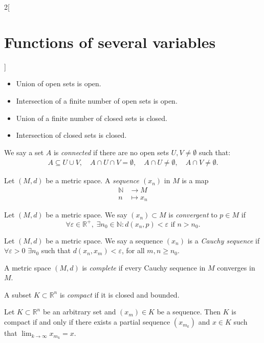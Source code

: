 \documentclass[../../../main.tex]{subfiles}
\begin{document}
\begin{multicols}{2}[\section{Functions of several variables}]
\begin{prop}
\hfill
\begin{itemize}
    \item Union of open sets is open.
    \item Intersection of a finite number of open sets is open.
    \item Union of a finite number of closed sets is closed.
    \item Intersection of closed sets is closed.
\end{itemize}
\end{prop}
\begin{definition}
We say a set $A$ is \textit{connected} if there are no open sets $U,V\ne\emptyset$ such that: 
\begin{gather*}
    A\subseteq U\cup V,\quad A\cap U\cap V=\emptyset,\quad A\cap U\ne\emptyset,\quad A\cap V\ne\emptyset.
\end{gather*}
\end{definition}
\begin{definition}
Let $(M,d)$ be a metric space. A \textit{sequence $(x_n)$} in $M$ is a map
\begin{align*}
    \mathbb{N}&\longrightarrow M\\
    n&\longmapsto x_n
\end{align*}
\end{definition}
\begin{definition}
Let $(M,d)$ be a metric space. We say $(x_n)\subset M$ is \textit{convergent} to $p\in M$ if $$\forall\varepsilon\in\mathbb{R}^+,\;\exists n_0\in\mathbb{N}:d(x_n,p)<\varepsilon\text{ if }n>n_0.$$
\end{definition}
\begin{definition}
Let $(M,d)$ be a metric space. We say a sequence $(x_n)$ is a \textit{Cauchy sequence} if $\forall\varepsilon>0$ $\exists n_0$ such that $d(x_n,x_m)<\varepsilon$, for all $m,n\geq n_0$.
\end{definition}
\begin{definition}
A metric space $(M,d)$ is \textit{complete} if every Cauchy sequence in $M$ converges in $M$.
\label{FOSV_complete}
\end{definition}
\begin{definition}
A subset $K\subset\mathbb{R}^n$ is \textit{compact} if it is closed and bounded.
\end{definition}
\begin{theorem}
Let $K\subset\mathbb{R}^n$ be an arbitrary set and $(x_m)\in K$ be a sequence. Then $K$ is compact if and only if there exists a partial sequence $(x_{m_k})$ and $x\in K$ such that $\displaystyle\lim_{k\to\infty}x_{m_k}=x$.
\end{theorem}

\end{multicols}
\end{document}
